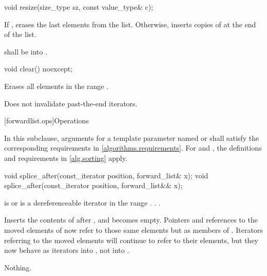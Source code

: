 \begin{itemdecl}
void resize(size_type sz, const value_type& c);
\end{itemdecl}

\begin{itemdescr}
\pnum
\effects If , erases the last  elements from the list. Otherwise, inserts 
copies of  at the end of the list.

\pnum
\requires {} shall be  into .
\end{itemdescr}


%
\begin{itemdecl}
void clear() noexcept;
\end{itemdecl}

\begin{itemdescr}
\pnum
\effects Erases all elements in the range .

\pnum
\remarks Does not invalidate past-the-end iterators.
\end{itemdescr}

[forwardlist.ops]{Operations}

\pnum
In this subclause,
arguments for a template parameter
named  or 
shall satisfy the corresponding requirements in \ref{algorithms.requirements}.
For  and ,
the definitions and requirements in \ref{alg.sorting} apply.

%
\begin{itemdecl}
void splice_after(const_iterator position, forward_list& x);
void splice_after(const_iterator position, forward_list&& x);
\end{itemdecl}

\begin{itemdescr}
\pnum
\requires {} is  or is a dereferenceable
iterator in the range .
.
.

\pnum
\effects Inserts the contents of  after
, and  becomes empty. Pointers and references to the moved
elements of  now refer to those same elements but as members of .
Iterators referring to the moved elements will continue to refer to their elements, but
they now behave as iterators into , not into .

\pnum
\throws Nothing.

\pnum
\complexity {}
\end{itemdescr}

